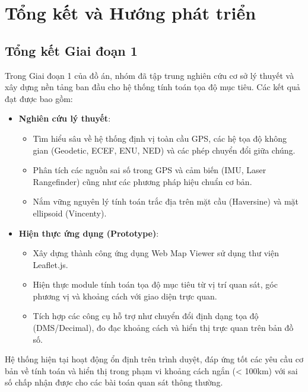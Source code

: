\section{Tổng kết và Hướng phát triển}

\subsection{Tổng kết Giai đoạn 1}
Trong Giai đoạn 1 của đồ án, nhóm đã tập trung nghiên cứu cơ sở lý thuyết và xây dựng nền tảng ban đầu cho hệ thống tính toán tọa độ mục tiêu. Các kết quả đạt được bao gồm:

\begin{itemize}
    \item \textbf{Nghiên cứu lý thuyết}:
    \begin{itemize}
        \item Tìm hiểu sâu về hệ thống định vị toàn cầu GPS, các hệ tọa độ không gian (Geodetic, ECEF, ENU, NED) và các phép chuyển đổi giữa chúng.
        \item Phân tích các nguồn sai số trong GPS và cảm biến (IMU, Laser Rangefinder) cũng như các phương pháp hiệu chuẩn cơ bản.
        \item Nắm vững nguyên lý tính toán trắc địa trên mặt cầu (Haversine) và mặt ellipsoid (Vincenty).
    \end{itemize}
    
    \item \textbf{Hiện thực ứng dụng (Prototype)}:
    \begin{itemize}
        \item Xây dựng thành công ứng dụng Web Map Viewer sử dụng thư viện Leaflet.js.
        \item Hiện thực module tính toán tọa độ mục tiêu từ vị trí quan sát, góc phương vị và khoảng cách với giao diện trực quan.
        \item Tích hợp các công cụ hỗ trợ như chuyển đổi định dạng tọa độ (DMS/Decimal), đo đạc khoảng cách và hiển thị trực quan trên bản đồ số.
    \end{itemize}
\end{itemize}

Hệ thống hiện tại hoạt động ổn định trên trình duyệt, đáp ứng tốt các yêu cầu cơ bản về tính toán và hiển thị trong phạm vi khoảng cách ngắn (< 100km) với sai số chấp nhận được cho các bài toán quan sát thông thường.


